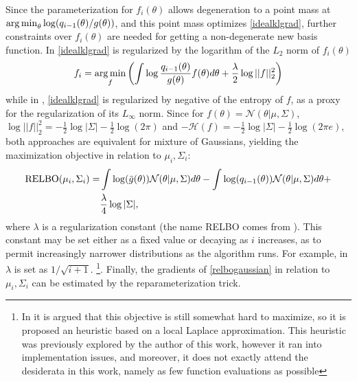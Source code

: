 Since the parameterization for $f_i(\theta)$ allows degeneration to a point mass at $\operatorname*{arg\,min}_{\theta} \log (q_{i-1}(\theta) / g(\theta))$, and this point mass optimizes \eqref{idealklgrad}, further constraints over $f_i(\theta)$ are needed for getting a non-degenerate new basis function. In \cite{Guo_2016} \eqref{idealklgrad} is regularized by the logarithm of the $L_2$ norm of $f_i(\theta)$
\begin{equation}
f_i =  \operatorname*{arg\,min}_{f} \left( \int \log \frac{q_{i-1}(\theta)}{g(\theta)} f(\theta) d\theta +  \frac{\lambda}{2} \log ||f||_2^2 \right)
\end{equation}
while in \cite{Locatelo_2018}, \eqref{idealklgrad} is regularized by negative of the entropy of $f$, as a proxy for the regularization of its $L_\infty$ norm. Since for $f(\theta) = \mathcal{N}(\theta|\mu,\Sigma)$, $\log ||f||_2^2 = -\frac{1}{2} \log |\Sigma| - \frac{1}{2} \log(2\pi)$ and $-\mathcal{H}(f) = -\frac{1}{2} \log |\Sigma| - \frac{1}{2} \log(2\pi e)$, both approaches are equivalent for mixture of Gaussians, yielding the maximization objective in relation to $\mu_i,\Sigma_i$:
\begin{equation}\label{relbogaussian}
\begin{split}
 \text{RELBO}(\mu_i,\Sigma_i) = & \int \log({\bar{g}}(\theta)) \mathcal{N}(\theta|\mu,\Sigma) d\theta - \int \log(q_{i-1}(\theta)) \mathcal{N}(\theta|\mu,\Sigma) d\theta + \\
 & \frac{\lambda}{4} \log |\Sigma|,
 \end{split}
\end{equation}
where $\lambda$ is a regularization constant (the name RELBO comes from \cite{Locatelo_2018}). This constant may be set either as a fixed value or decaying as $i$ increases, as to permit increasingly narrower distributions as the algorithm runs. For example, in \cite{Locatelo_2018} $\lambda$ is set as $1/\sqrt{i+1}$. \footnote{In \cite{Guo_2016} it is argued that this objective is still somewhat hard to maximize, so it is proposed an heuristic based on a local Laplace approximation. This heuristic was previously explored by the author of this work, however it ran into implementation issues, and moreover, it does not exactly attend the desiderata in this work, namely as few function evaluations as possible}. Finally, the gradients of \eqref{relbogaussian} in relation to $\mu_i,\Sigma_i$ can be estimated by the reparameterization trick. 

